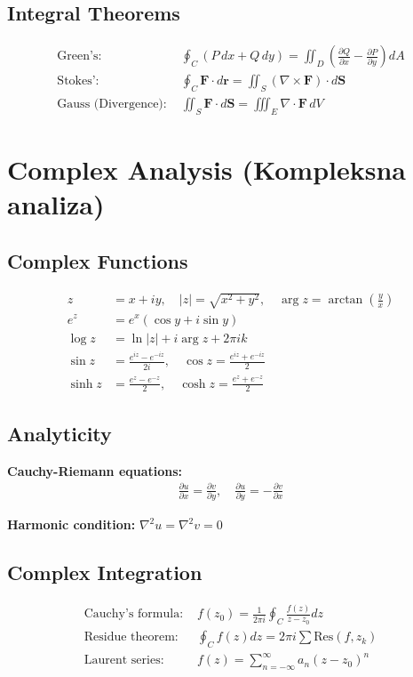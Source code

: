 \documentclass[10pt,twocolumn,a4paper]{article}
\begin{document}
\subsection{Integral Theorems}
\begin{align}
\text{Green's: } &\oint_C (P \, dx + Q \, dy) = \iint_D \left(\frac{\partial Q}{\partial x} - \frac{\partial P}{\partial y}\right) dA\\
\text{Stokes': } &\oint_C \mathbf{F} \cdot d\mathbf{r} = \iint_S (\nabla \times \mathbf{F}) \cdot d\mathbf{S}\\
\text{Gauss (Divergence): } &\iint_S \mathbf{F} \cdot d\mathbf{S} = \iiint_E \nabla \cdot \mathbf{F} \, dV
\end{align}

\section{Complex Analysis (Kompleksna analiza)}

\subsection{Complex Functions}
\begin{align}
z &= x + iy, \quad |z| = \sqrt{x^2 + y^2}, \quad \arg z = \arctan\left(\frac{y}{x}\right)\\
e^z &= e^x(\cos y + i\sin y)\\
\log z &= \ln|z| + i\arg z + 2\pi ik\\
\sin z &= \frac{e^{iz} - e^{-iz}}{2i}, \quad \cos z = \frac{e^{iz} + e^{-iz}}{2}\\
\sinh z &= \frac{e^z - e^{-z}}{2}, \quad \cosh z = \frac{e^z + e^{-z}}{2}
\end{align}

\subsection{Analyticity}
\textbf{Cauchy-Riemann equations:}
\begin{align}
\frac{\partial u}{\partial x} = \frac{\partial v}{\partial y}, \quad \frac{\partial u}{\partial y} = -\frac{\partial v}{\partial x}
\end{align}

\textbf{Harmonic condition:} $\nabla^2 u = \nabla^2 v = 0$

\subsection{Complex Integration}
\begin{align}
\text{Cauchy's formula: } &f(z_0) = \frac{1}{2\pi i} \oint_C \frac{f(z)}{z - z_0} dz\\
\text{Residue theorem: } &\oint_C f(z) dz = 2\pi i \sum \text{Res}(f, z_k)\\
\text{Laurent series: } &f(z) = \sum_{n=-\infty}^{\infty} a_n (z - z_0)^n
\end{align}
\end{document}
